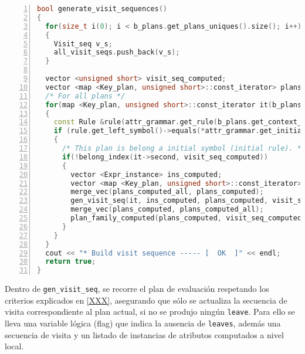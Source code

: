 \begin{lstlisting}[language=C++, basicstyle=\tiny, numbers=left, columns=fullflexible, linewidth=14.5cm]
bool generate_visit_sequences()
{
  for(size_t i(0); i < b_plans.get_plans_uniques().size(); i++)
  {
    Visit_seq v_s;
    all_visit_seqs.push_back(v_s);
  }

  vector <unsigned short> visit_seq_computed;
  vector <map <Key_plan, unsigned short>::const_iterator> plans_computed_all;
  /* For all plans */
  for(map <Key_plan, unsigned short>::const_iterator it(b_plans.get_plans().begin()); it != b_plans.get_plans().end(); it++)
  {
    const Rule &rule(attr_grammar.get_rule(b_plans.get_context_unique(it->first.id_plan)[0]));
    if (rule.get_left_symbol()->equals(*attr_grammar.get_initial_symb()))
    {
      /* This plan is belong a initial symbol (initial rule). */
      if(!belong_index(it->second, visit_seq_computed))
      {
        vector <Expr_instance> ins_computed;
        vector <map <Key_plan, unsigned short>::const_iterator> plans_computed;
        merge_vec(plans_computed_all, plans_computed);
        gen_visit_seq(it, ins_computed, plans_computed, visit_seq_computed);
        merge_vec(plans_computed, plans_computed_all);
        plan_family_computed(plans_computed, visit_seq_computed);
      }
    }
  }
  cout << "* Build visit sequence ----- [  OK  ]" << endl;
  return true;
}
\end{lstlisting}

Dentro de \texttt{gen\_visit\_seq}, se recorre el plan de evaluación respetando los criterios explicados en \ref{XXX}, asegurando que sólo se actualiza la secuencia de visita correspondiente al plan actual, si no se produjo ningún \texttt{leave}. Para ello se lleva una variable lógica (flag) que indica la ausencia de \texttt{leaves}, además una secuencia de visita y un listado de instancias de atributos computados a nivel local.

